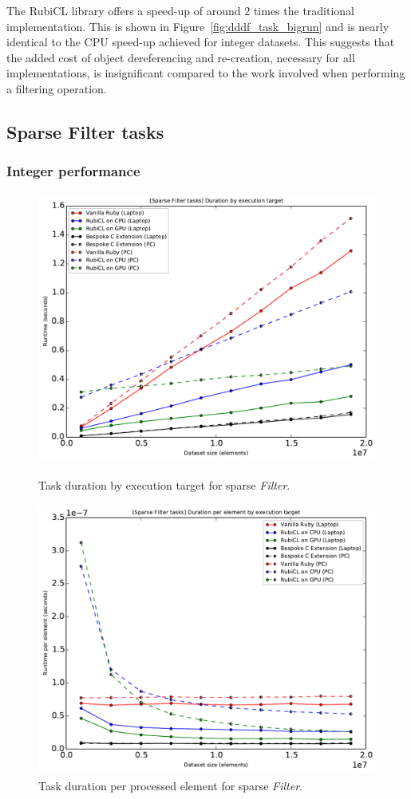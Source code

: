 The RubiCL library offers a speed-up of around $2$ times the traditional implementation. This is shown in Figure~\ref{fig:dddf_task_bigrun} and is nearly identical to the \ac{CPU} speed-up achieved for integer datasets. This suggests that the added cost of object dereferencing and re-creation, necessary for all implementations, is insignificant compared to the work involved when performing a filtering operation.


\subsection{Sparse Filter tasks}
\subsubsection{Integer performance}
\begin{figure}[H]
  \centering
  \includegraphics[width=\textwidth]{./graphing/sparse_filter/runtimes.pdf}
  \caption{Task duration by execution target for sparse \emph{Filter}.}
  \label{fig:sfilter_task_runtime_g}

  \includegraphics[width=\textwidth]{./graphing/sparse_filter/per_element.pdf}
  \caption{Task duration per processed element for sparse \emph{Filter}.}
  \label{fig:sfilter_task_per_el_g}


\end{figure}
